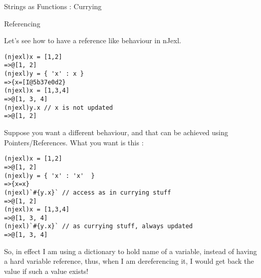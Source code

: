 \begin{section}{Strings as Functions : Currying}
\begin{subsection}{Referencing}

Let's see how to have a reference like behaviour in nJexl.

\begin{lstlisting}[style=all]
(njexl)x = [1,2]
=>@[1, 2]
(njexl)y = { 'x' : x }
=>{x=[I@5b37e0d2}
(njexl)x = [1,3,4]
=>@[1, 3, 4]
(njexl)y.x // x is not updated 
=>@[1, 2]
\end{lstlisting}

Suppose you want a different behaviour, and that can be achieved using Pointers/References. 
What you want is this :

\begin{lstlisting}[style=all]
(njexl)x = [1,2]
=>@[1, 2]
(njexl)y = { 'x' : 'x'  }
=>{x=x}
(njexl)`#{y.x}` // access as in currying stuff
=>@[1, 2]
(njexl)x = [1,3,4]
=>@[1, 3, 4]
(njexl)`#{y.x}` // as currying stuff, always updated 
=>@[1, 3, 4]
\end{lstlisting}

So, in effect I am using a dictionary to hold name of a variable, instead of having a hard variable reference, 
thus, when I am dereferencing it, I would get back the value if such a value exists!

\end{subsection}

\end{section}

